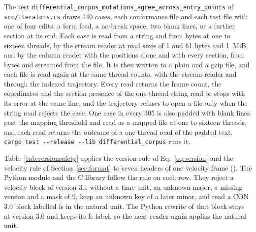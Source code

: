 \documentclass[preprint,12pt]{elsarticle}
\begin{document}
The test \texttt{differential\_\allowbreak corpus\_\allowbreak mutations\_\allowbreak agree\_\allowbreak across\_\allowbreak entry\_\allowbreak points} of \texttt{src/\allowbreak iterators.rs} draws 140 cases, each conformance file and each test file with one of four edits: a form feed, a no-break space, two blank lines, or a further section at its end.
Each case is read from a string and from bytes at one to sixteen threads, by the stream reader at read sizes of 1 and 61 bytes and 1~MiB, and by the column reader with the positions alone and with every section, from bytes and streamed from the file.
It is then written to a plain and a gzip file, and each file is read again at the same thread counts, with the stream reader and through the indexed trajectory.
Every read returns the frame count, the coordinates and the section presence of the one-thread string read or stops with its error at the same line, and the trajectory refuses to open a file only when the string read rejects the case.
One case in every 305 is also padded with blank lines past the mapping threshold and read as a mapped file at one to sixteen threads, and each read returns the outcome of a one-thread read of the padded text.
\texttt{cargo test -{}-release -{}-lib differential\_corpus} runs it.

\begin{footnotesize}  \end{footnotesize}





Table~\ref{tab:versionsafety} applies the version rule of Eq.~\eqref{eq:version} and the velocity rule of Section~\ref{sec:format} to seven headers of one velocity frame ().
The Python module and the C library follow the rule on each row.
They reject a velocity block of version 3.1 without a time unit, an unknown major, a missing version and a mask of 9, keep an unknown key of a later minor, and read a CON 3.0 block labelled fs in the natural unit.
The Python rewrite of that block stays at version 3.0 and keeps its fs label, so the next reader again applies the natural unit.


\end{document}
